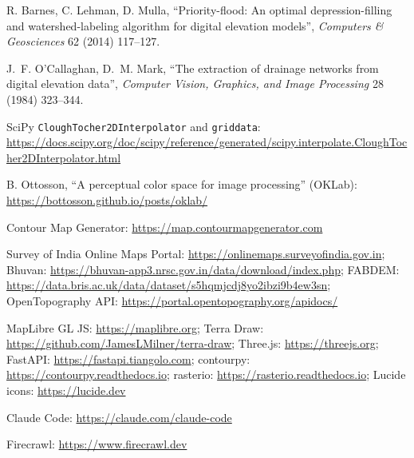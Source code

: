 \documentclass[11pt,a4paper]{article}
\newcommand{\code}[1]{\texttt{#1}}
\begin{document}
\begin{enumerate}[label={[\arabic*]},ref={\arabic*},leftmargin=*]
\item\label{ref:barnes} R. Barnes, C. Lehman, D. Mulla, ``Priority-flood: An optimal depression-filling and watershed-labeling algorithm for digital elevation models'', \emph{Computers \& Geosciences} 62 (2014) 117--127.
\item\label{ref:d8} J.~F. O'Callaghan, D.~M. Mark, ``The extraction of drainage networks from digital elevation data'', \emph{Computer Vision, Graphics, and Image Processing} 28 (1984) 323--344.
\item\label{ref:ct} SciPy \code{CloughTocher2DInterpolator} and \code{griddata}: \url{https://docs.scipy.org/doc/scipy/reference/generated/scipy.interpolate.CloughTocher2DInterpolator.html}
\item\label{ref:oklab} B. Ottosson, ``A perceptual color space for image processing'' (OKLab): \url{https://bottosson.github.io/posts/oklab/}
\item\label{ref:cmg} Contour Map Generator: \url{https://map.contourmapgenerator.com}
\item\label{ref:soi} Survey of India Online Maps Portal: \url{https://onlinemaps.surveyofindia.gov.in}; Bhuvan: \url{https://bhuvan-app3.nrsc.gov.in/data/download/index.php}; FABDEM: \url{https://data.bris.ac.uk/data/dataset/s5hqmjcdj8yo2ibzi9b4ew3sn}; OpenTopography API: \url{https://portal.opentopography.org/apidocs/}
\item\label{ref:libs} MapLibre GL JS: \url{https://maplibre.org}; Terra Draw: \url{https://github.com/JamesLMilner/terra-draw}; Three.js: \url{https://threejs.org}; FastAPI: \url{https://fastapi.tiangolo.com}; contourpy: \url{https://contourpy.readthedocs.io}; rasterio: \url{https://rasterio.readthedocs.io}; Lucide icons: \url{https://lucide.dev}
\item\label{ref:claude} Claude Code: \url{https://claude.com/claude-code}
\item\label{ref:firecrawl} Firecrawl: \url{https://www.firecrawl.dev}
\end{enumerate}

\clearpage
\appendix
\end{document}
